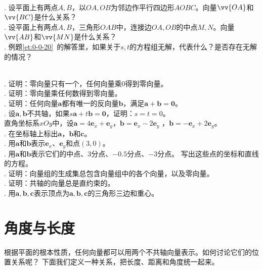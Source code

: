 \documentclass[12pt,UTF8,fontset=none]{ctexbook}
\begin{document}
\begin{sk}\label{sk:0-0-10}
    \mbox{}\\
    . 设平面上有两点$A,B$，以$OA, OB$为邻边作平行四边形$AOBC$。向量$\vv{OA}$和$\vv{BC}$是什么关系？\\
    . 设平面上有两点$A,B$，三角形$OAB$中，连接边$OA, OB$的中点$M,N$。向量$\vv{AB}$和$\vv{MN}$是什么关系？\\
    . 例题\ref{et:0-0-20}\ 的解答里，如果关于$s,t$的方程组无解，代表什么？是否存在无解的情况？
\end{sk}
\begin{xt}\label{xt:0-0-10}
    \mbox{} \\
    . 证明：零向量只有一个，任何向量乘$0$得到零向量。\\
    . 证明：零向量乘任何数得到零向量。\\
    . 证明：任何向量$\mathbf{a}$都有唯一的反向量$\mathbf{b}$，满足$\mathbf{a} + \mathbf{b} = \mathbf{0}$。\\
    . 设$\mathbf{a}, \mathbf{b}$不共轴，如果$s\mathbf{a} + t\mathbf{b} = \mathbf{0}$，证明：$s = t = 0$。\\
    直角坐标系$xOy$中，设$\mathbf{a} = 4\mathbf{e}_x + \mathbf{e}_y$，$\mathbf{b} = \mathbf{e}_x - 2\mathbf{e}_y$
    ，$\mathbf{b} = -\mathbf{e}_x + 2\mathbf{e}_y$。\\
    . 在坐标轴上标出$\mathbf{a}$，$\mathbf{b}$和$\mathbf{c}$。\\
    . 用$\mathbf{a}$和$\mathbf{b}$表示$\mathbf{e}_x$、$\mathbf{e}_y$和点$(3,0)$。\\
    . 用$\mathbf{a}$和$\mathbf{b}$表示它们的中点、$3$分点、$-0.5$分点、$-3$分点。
    写出这些点的坐标和直线的方程。\\
    . 证明：向量组的生成集总包含向量组中的各个向量，以及零向量。\\
    . 证明：共轴的向量总是直约束的。\\
    . 用$\mathbf{a}, \mathbf{b}, \mathbf{c}$表示顶点为$\mathbf{a}, \mathbf{b}, \mathbf{c}$的三角形三边和重心。
\end{xt}

\section{角度与长度}
根据平面的根本性质，任何向量都可以用两个不共轴向量表示。如何讨论它们的位置关系呢？
下面我们定义一种关系，把长度、距离和角度统一起来。
\end{document}
